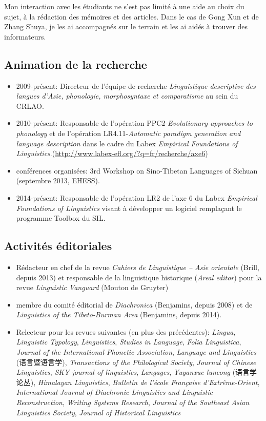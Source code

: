 \documentclass[oldfontcommands,oneside,a4paper,11pt]{article}
\newcommand{\zh}[1]{{\cn #1}}
\begin{document}
Mon interaction avec les étudiants ne s'est pas limité à une aide au choix du sujet, à la rédaction des mémoires et des articles. Dans le cas de Gong Xun et de Zhang Shuya, je les ai accompagnés sur le terrain et les ai aidés à trouver des informateurs.

\subsection{Animation de la recherche}
\begin{itemize}
\item 2009-présent: Directeur de l'équipe de recherche \textit{Linguistique descriptive des langues d’Asie, phonologie, morphosyntaxe et comparatisme} au sein du CRLAO.
\item 2010-présent: Responsable de l'opération PPC2-\textit{Evolutionary approaches to phonology} et de l'opération LR4.11-\textit{Automatic paradigm generation and language description} dans le cadre du Labex \textit{Empirical Foundations of Linguistics}.(\url{http://www.labex-efl.org/?q=fr/recherche/axe6})
\item conférences organisées:  3rd Workshop on Sino-Tibetan Languages of Sichuan (septembre 2013, EHESS).
\item  2014-présent: Responsable de l'opération LR2 de l'axe 6 du Labex \textit{Empirical Foundations of Linguistics} visant à développer un logiciel remplaçant le programme Toolbox du SIL.
\end{itemize}


\subsection{Activités éditoriales}
\begin{itemize}
\item Rédacteur en chef de la revue \textit{Cahiers de Linguistique -- Asie orientale} (Brill, depuis 2013) et responsable de la linguistique historique (\textit{Areal editor}) pour la revue \textit{Linguistic Vanguard} (Mouton de Gruyter)
\item membre du comité éditorial de \textit{Diachronica} (Benjamins, depuis 2008) et de \textit{Linguistics of the Tibeto-Burman Area}  (Benjamins, depuis 2014).
\item Relecteur pour les revues suivantes (en plus des précédentes):  \textit{Lingua}, \textit{Linguistic Typology}, \textit{Linguistics}, \textit{Studies in Language}, \textit{Folia Linguistica}, \textit{Journal of the International Phonetic Association},  \textit{Language and Linguistics} (\zh{语言暨语言学}), \textit{Transactions of the Philological Society}, \textit{Journal of Chinese Linguistics}, \textit{SKY journal of linguistics}, \textit{Langages}, \textit{Yuyanxue luncong} (\zh{语言学论丛}), 	\textit{Himalayan Linguistics}, \textit{Bulletin de l’école Française d’Extrême-Orient}, 	\textit{International Journal of Diachronic Linguistics and Linguistic Reconstruction}, \textit{Writing Systems Research}, 	\textit{Journal of the Southeast Asian Linguistics Society}, \textit{Journal of Historical Linguistics}
\end{itemize}
\end{document}
